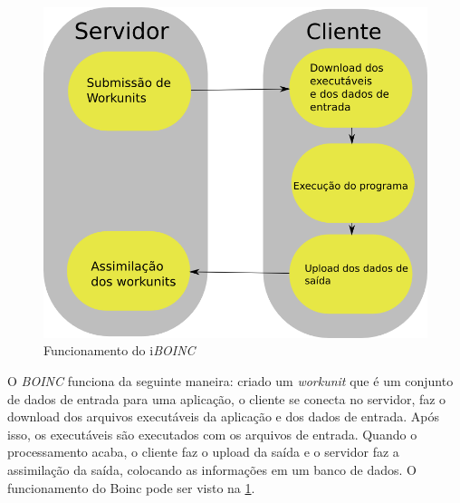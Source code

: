 \documentclass[b1,portrait]{sciposter}
\begin{document}
\begin{multicols}{2}
\begin{figure}[!h]
  \centering
  \includegraphics[scale=0.5]{boinc-schema.png}
  \caption{Funcionamento do i\textit{BOINC}}
  \label{boinc_funcionamento}
\end{figure}

O \textit{BOINC} funciona da seguinte maneira: criado um \textit{workunit} que é um conjunto de dados de entrada para uma aplicação, 
o cliente se conecta no servidor, faz o download dos arquivos executáveis da aplicação e dos dados de entrada. Após isso, 
os executáveis são executados com os arquivos de entrada. Quando o processamento acaba, o cliente faz o upload da saída
e o servidor faz a assimilação da saída, colocando as informações em um banco de dados. O funcionamento do Boinc pode ser visto 
na \ref{boinc_funcionamento}.



\end{multicols}
\end{document}
